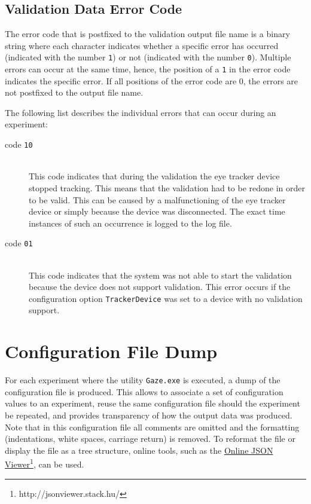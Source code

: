 \documentclass[a4paper,oneside]{book}
\begin{document}
\subsection{Validation Data Error Code}
\label{sect.validation.error}
The error code that is postfixed to the validation output file name is a binary string where each character indicates whether a specific error has occurred (indicated with the number \texttt{1}) or not (indicated with the number \texttt{0}).
Multiple errors can occur at the same time, hence, the position of a \texttt{1} in the error code indicates the specific error.
If all positions of the error code are 0, the errors are not postfixed to the output file name.

The following list describes the individual errors that can occur during an experiment:
\begin{description}
    \item[code \texttt{10}] \hfill \\
        This code indicates that during the validation the eye tracker device stopped tracking.
        This means that the validation had to be redone in order to be valid.
        This can be caused by a malfunctioning of the eye tracker device or simply because the device was disconnected.
        The exact time instances of such an occurrence is logged to the log file.
    \item[code \texttt{01}] \hfill \\
        This code indicates that the system was not able to start the validation because the device does not support validation.
        This error occurs if the configuration option \texttt{TrackerDevice} was set to a device with no validation support.
\end{description}

\section{Configuration File Dump}
For each experiment where the utility \texttt{Gaze.exe} is executed, a dump of the configuration file is produced.
This allows to associate a set of configuration values to an experiment, reuse the same configuration file should the experiment be repeated, and provides transparency of how the output data was produced.
Note that in this configuration file all comments are omitted and the formatting (indentations, white spaces, carriage return) is removed.
To reformat the file or display the file as a tree structure, online tools, such as the \href{http://jsonviewer.stack.hu/}{Online JSON Viewer}\footnote{http://jsonviewer.stack.hu/}, can be used.
\end{document}
